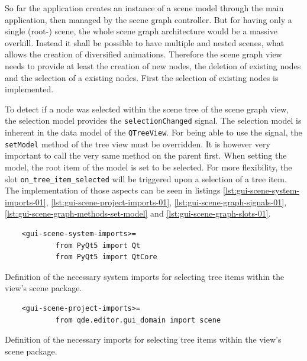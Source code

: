 \documentclass[10pt, openright, notitlepage]{scrreprt}
\begin{document}
So far the application creates an instance of a scene model through the main
application, then managed by the scene graph controller. But for having only a
single (root-) scene, the whole scene graph architecture would be a massive
overkill. Instead it shall be possible to have multiple and nested scenes, what
allows the creation of diversified animations. Therefore the scene graph view
needs to provide at least the creation of new nodes, the deletion of existing
nodes and the selection of a existing nodes. First the selection of existing
nodes is implemented.

To detect if a node was selected within the scene tree of the scene graph view,
the selection model provides the \texttt{selectionChanged} signal. The
selection model is inherent in the data model of the \texttt{QTreeView}. For
being able to use the signal, the \texttt{setModel} method of the tree view
must be overridden. It is however very important to call the very same method on
the parent first. When setting the model, the root item of the model is set to be
selected.
For more flexibility, the slot \texttt{on\_tree\_item\_selected} will be
triggered upon a selection of a tree item. The implementation of those aspects
can be seen in listings \ref{lst:gui-scene-system-imports-01},
\ref{lst:gui-scene-project-imports-01}, \ref{lst:gui-scene-graph-signals-01},
\ref{lst:gui-scene-graph-methods-set-model} and \ref{lst:gui-scene-graph-slots-01}.

\begin{listing}[H]
\begin{verbatim}
    <gui-scene-system-imports>=
            from PyQt5 import Qt
            from PyQt5 import QtCore
\end{verbatim}
\caption{\label{lst:gui-scene-system-imports-01}
Definition of the necessary system imports for selecting tree items within the view's scene package.}
\end{listing}

\begin{listing}[H]
\begin{verbatim}
    <gui-scene-project-imports>=
            from qde.editor.gui_domain import scene
\end{verbatim}
\caption{\label{lst:gui-scene-project-imports-01}
Definition of the necessary imports for selecting tree items within the view's scene package.}
\end{listing}
\end{document}
